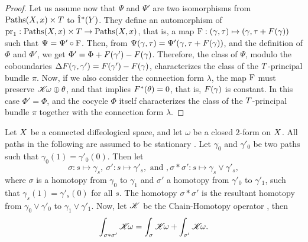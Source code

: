 \begin{proof}
  Let us assume now that $\Psi$ and $\Psi'$ are two isomorphisms from $\operatorname{Paths}(X,x) \times T$ to $\hat 1^*(Y)$.
  They define an automorphism of $\mathrm{pr}_1 : \operatorname{Paths}(X,x) \times T \to \operatorname{Paths}(X,x)$,
  that is,
  a map $\mathrm{F} : (\gamma,\tau) \mapsto (\gamma, \tau + F(\gamma))$ such that $\Psi = \Psi' \circ \mathrm{F}$.
  Then,
  from $\Psi(\gamma,\tau) = \Psi'(\gamma,\tau + F(\gamma))$,
  and the definition of $\Phi$ and $\Phi'$,
  we get $\Phi' = \Phi + F(\gamma') - F(\gamma)$.
  Therefore,
  the class of $\Psi$,
  modulo the coboundaries $\Delta F(\gamma,\gamma') = F(\gamma') - F(\gamma)$,
  characterizes the class of the $T$-principal bundle $\pi$.
  Now,
  if we also consider the connection form $\lambda$,
  the map $\mathrm{F}$ must preserve $\mathscr{K}\!\omega \oplus \theta$,
  and that implies $F^*(\theta) = 0$,
  that is,
  $F(\gamma)$ is constant.
  In this case $\Phi'= \Phi$,
  and the cocycle $\Phi$ itself characterizes the class of the $T$-principal bundle $\pi$ together with the connection form $\lambda$.
\end{proof}

\begin{article}
  \label{Integrating-concatenations-over-homotopies}
  Let $X$ be a connected diffeological space,
  and let $\omega$ be a closed $2$-form on $X$.
  All paths in the following are assumed to be stationary .
  Let $\gamma_0$ and $\gamma'_0$ be two paths such that $\gamma_0(1) = \gamma'_0(0)$.
  Then let
  $$%
  \sigma : s \mapsto \gamma_s, \ \sigma' : s \mapsto \gamma'_s, \text{ and }, \sigma*\sigma' : s \mapsto \gamma_s \vee \gamma'_s,
  $$%
  where $\sigma$ is a homotopy from $\gamma_0$ to $\gamma_1$ and $\sigma'$ a homotopy from $\gamma'_0$ to $\gamma'_1$,
  such that $\gamma_s(1) = \gamma'_s(0)$ for all $s$.
  The homotopy $\sigma*\sigma'$ is the resultant homotopy from $\gamma_0 \vee \gamma'_0$ to $\gamma_1 \vee \gamma'_1$.
  Now,
  let $\mathscr{K}$ be the Chain-Homotopy operator ,
  then
  \begin{equation}
    \renewcommand{\theequation}{$\clubsuit$}
    \int_{\sigma * \sigma'} \CHK\!\omega = \int_\sigma \CHK\!\omega + \int_{\sigma'} \CHK\!\omega.
  \end{equation}
\end{article} %

